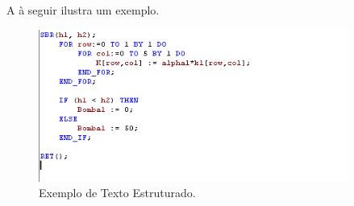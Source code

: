 A  à seguir ilustra um exemplo.

\begin{figure}[H]
	\centering
	\includegraphics[height=5cm,keepaspectratio]{img/strText.png}
	\caption{Exemplo de Texto Estruturado.}
	\label{imgTexEst}
\end{figure}

%


